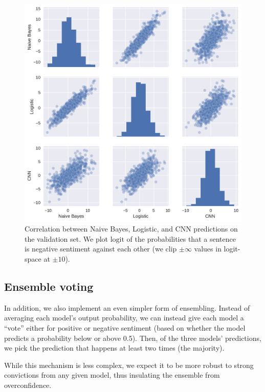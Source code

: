 \documentclass[11pt]{article}
\begin{document}
\begin{figure}[tb]
  \centering
  \includegraphics[width=\textwidth]{corrs.pdf}
  \caption{Correlation between Naive Bayes, Logistic, and CNN predictions on
  the validation set. We plot $\text{logit}$ of the probabilities that a
  sentence is negative sentiment against each other (we clip $\pm \infty$
  values in logit-space at $\pm 10$).}
  \label{fig:corrs}
\end{figure}

\subsection{Ensemble voting}
\label{subsec:voting}

In addition, we also implement an even simpler form of ensembling. Instead of
averaging each model's output probability, we can instead give each model a
``vote'' either for positive or negative sentiment (based on whether the model
predicts a probability  below or above 0.5). Then, of the three models'
predictions, we pick the prediction that happens at least two times (the
majority).

While this mechanism is less complex, we expect it to be more robust to strong
convictions from any given model, thus insulating the ensemble from
overconfidence. 
\end{document}
